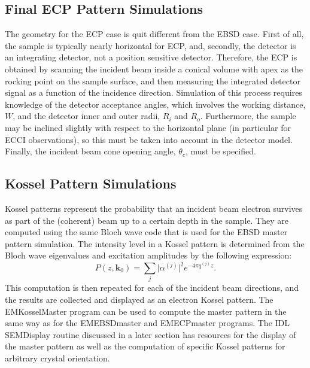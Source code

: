 \documentclass[DIV=calc, paper=letter, fontsize=11pt]{scrartcl}	 %
\begin{document}
\subsection{Final ECP Pattern Simulations \label{sec:ECP}}
The geometry for the ECP case is quit different from the EBSD case.  First of all, the sample is typically nearly horizontal for ECP,
and, secondly, the detector is an integrating detector, not a position sensitive detector.  Therefore, the ECP is obtained by scanning
the incident beam inside a conical volume with apex as the rocking point on the sample surface, and then measuring the integrated 
detector signal as a function of the incidence direction.  Simulation of this process requires knowledge of the detector acceptance 
angles, which involves the working distance, $W$, and the detector inner and outer radii, $R_i$ and $R_o$.  Furthermore, the sample may be inclined
slightly with respect to the horizontal plane (in particular for ECCI observations), so this must be taken into account in the detector model.
Finally, the incident beam cone opening angle, $\theta_c$, must be specified.  %

\subsection{Kossel Pattern Simulations\label{sec:Kossel}}
Kossel patterns represent the probability that an incident beam electron survives as part of the (coherent) beam up to a certain depth in
the sample.  They are computed using the same Bloch wave code that is used for the EBSD master pattern simulation.  The intensity level in 
a Kossel pattern is determined from the Bloch wave eigenvalues and excitation amplitudes by the following expression:
\begin{equation}
	P(z,\mathbf{k}_0) = \sum_j \vert \alpha^{(j)}\vert^2 e^{-4\pi q^{(j)}z}.\label{eq:EKP}
\end{equation}
This computation is then repeated for each of the incident beam directions, and the results are collected and displayed as an 
electron Kossel pattern.  The \textsf{EMKosselMaster} program can be used to compute the master pattern in the same way as for
the \textsf{EMEBSDmaster} and \textsf{EMECPmaster} programs.  The IDL \textsf{SEMDisplay} routine discussed in a later section
has resources for the display of the master pattern as well as the computation of specific Kossel patterns for arbitrary 
crystal orientation.
\end{document}
